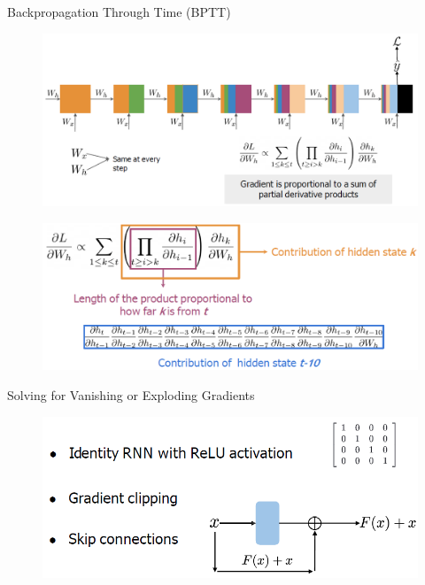 \begin{frame}[allowframebreaks]{Backpropagation Through Time (BPTT)}
    \begin{figure}
        \centering
        \includegraphics[width=\linewidth, height=0.9\textheight,keepaspectratio]{images/nlp/rnn-backpropagation.png}
    \end{figure}
    \framebreak
    \begin{figure}
        \centering
        \includegraphics[width=\linewidth, height=0.9\textheight,keepaspectratio]{images/nlp/rnn-backpropagation-2.png}
    \end{figure}
\end{frame}

\begin{frame}{Solving for Vanishing or Exploding Gradients}
    \begin{figure}
        \centering
        \includegraphics[width=\linewidth, height=0.9\textheight,keepaspectratio]{images/nlp/vanishing-exploding-gradients.png}
    \end{figure}
\end{frame}